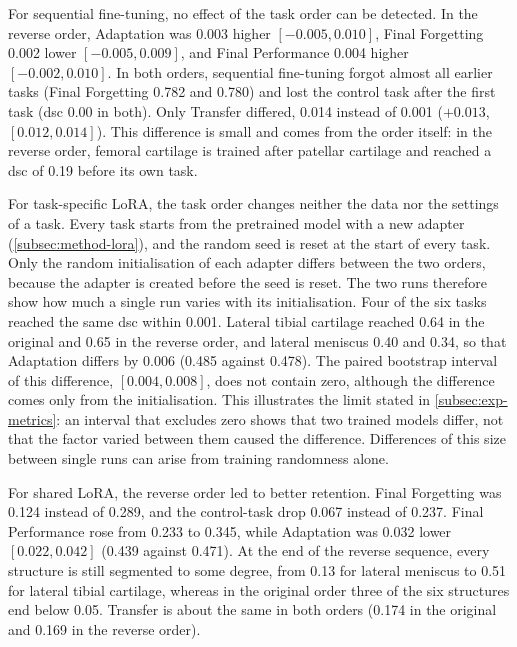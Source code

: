 For sequential fine-tuning, no effect of the task order can be detected.
In the reverse order, Adaptation was 0.003 higher $[-0.005, 0.010]$, Final Forgetting 0.002 lower $[-0.005, 0.009]$, and Final Performance 0.004 higher $[-0.002, 0.010]$.
In both orders, sequential fine-tuning forgot almost all earlier tasks (Final Forgetting 0.782 and 0.780) and lost the control task after the first task (\gls{dsc} 0.00 in both).
Only Transfer differed, 0.014 instead of 0.001 ($+0.013$, $[0.012, 0.014]$).
This difference is small and comes from the order itself: in the reverse order, femoral cartilage is trained after patellar cartilage and reached a \gls{dsc} of 0.19 before its own task.

For task-specific LoRA, the task order changes neither the data nor the settings of a task.
Every task starts from the pretrained model with a new adapter (\cref{subsec:method-lora}), and the random seed is reset at the start of every task.
Only the random initialisation of each adapter differs between the two orders, because the adapter is created before the seed is reset.
The two runs therefore show how much a single run varies with its initialisation.
Four of the six tasks reached the same \gls{dsc} within 0.001.
Lateral tibial cartilage reached 0.64 in the original and 0.65 in the reverse order, and lateral meniscus 0.40 and 0.34, so that Adaptation differs by 0.006 (0.485 against 0.478).
The paired bootstrap interval of this difference, $[0.004, 0.008]$, does not contain zero, although the difference comes only from the initialisation.
This illustrates the limit stated in \cref{subsec:exp-metrics}: an interval that excludes zero shows that two trained models differ, not that the factor varied between them caused the difference.
Differences of this size between single runs can arise from training randomness alone.

For shared LoRA, the reverse order led to better retention.
Final Forgetting was 0.124 instead of 0.289, and the control-task drop 0.067 instead of 0.237.
Final Performance rose from 0.233 to 0.345, while Adaptation was 0.032 lower $[0.022, 0.042]$ (0.439 against 0.471).
At the end of the reverse sequence, every structure is still segmented to some degree, from 0.13 for lateral meniscus to 0.51 for lateral tibial cartilage, whereas in the original order three of the six structures end below 0.05.
Transfer is about the same in both orders (0.174 in the original and 0.169 in the reverse order).

